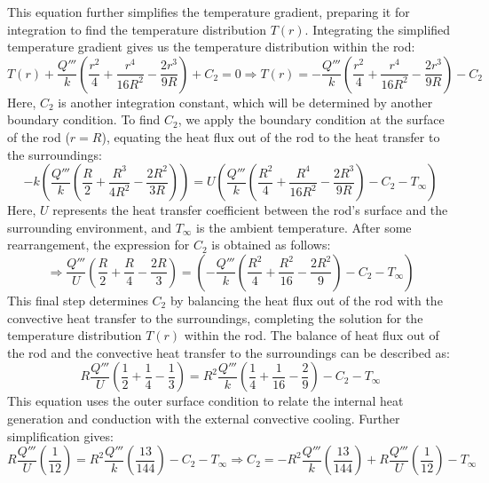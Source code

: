 \documentclass{article}
\numberwithin{equation}{section}
\begin{document}
\noindent
This equation further simplifies the temperature gradient, preparing it for integration to find the temperature distribution \(T(r)\). Integrating the simplified temperature gradient gives us the temperature distribution within the rod:
\begin{equation}
T(r) + \frac{Q'''}{k} \left( \frac{r^2}{4} + \frac{r^4}{16R^2} - \frac{2r^3}{9R} \right) + C_2 = 0 \Rightarrow T(r) = -\frac{Q'''}{k} \left( \frac{r^2}{4} + \frac{r^4}{16R^2} - \frac{2r^3}{9R} \right) - C_2
\end{equation}
\noindent
Here, \(C_2\) is another integration constant, which will be determined by another boundary condition. To find \(C_2\), we apply the boundary condition at the surface of the rod (\(r=R\)), equating the heat flux out of the rod to the heat transfer to the surroundings:
\begin{equation}
-k \left( \frac{Q'''}{k} \left( \frac{R}{2} + \frac{R^3}{4R^2} - \frac{2R^2}{3R} \right) \right) = U \left( \frac{Q'''}{k} \left( \frac{R^2}{4} + \frac{R^4}{16R^2} - \frac{2R^3}{9R} \right) - C_2 - T_{\infty} \right)
\end{equation}
\noindent
Here, \(U\) represents the heat transfer coefficient between the rod's surface and the surrounding environment, and \(T_{\infty}\) is the ambient temperature. After some rearrangement, the expression for \(C_2\) is obtained as follows:
\begin{equation}
\Rightarrow \frac{Q'''}{U} \left( \frac{R}{2} + \frac{R}{4} - \frac{2R}{3} \right) = \left( -\frac{Q'''}{k} \left( \frac{R^2}{4} + \frac{R^2}{16} - \frac{2R^2}{9} \right) - C_2 - T_{\infty} \right)
\end{equation}
\noindent
This final step determines \(C_2\) by balancing the heat flux out of the rod with the convective heat transfer to the surroundings, completing the solution for the temperature distribution \(T(r)\) within the rod. The balance of heat flux out of the rod and the convective heat transfer to the surroundings can be described as:
\begin{equation}
R \frac{Q'''}{U} \left( \frac{1}{2} + \frac{1}{4} - \frac{1}{3} \right) = R^2 \frac{Q'''}{k} \left( \frac{1}{4} + \frac{1}{16} - \frac{2}{9} \right) - C_2 - T_{\infty}
\end{equation}
\noindent
This equation uses the outer surface condition to relate the internal heat generation and conduction with the external convective cooling. Further simplification gives:
\begin{equation}
R \frac{Q'''}{U} \left( \frac{1}{12} \right) = R^2 \frac{Q'''}{k} \left( \frac{13}{144} \right) - C_2 - T_{\infty} \Rightarrow C_2 = -R^2 \frac{Q'''}{k} \left( \frac{13}{144} \right) + R \frac{Q'''}{U} \left( \frac{1}{12} \right) - T_{\infty}
\end{equation}
\end{document}
